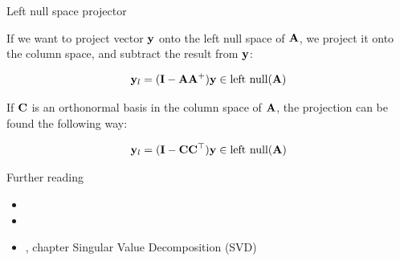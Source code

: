\documentclass{beamer}
\begin{document}
\begin{frame}{Left null space projector}
	\begin{flushleft}
		
		If we want to project vector $\mathbf{y}$ onto the left null space of $\mathbf{A}$, we project it onto the column space, and subtract the result from $\mathbf{y}$:
		
		\begin{equation}
			\mathbf{y}_l = (\mathbf{I} - \mathbf{A}\mathbf{A}^+) \mathbf{y} \in \text{left null}(\mathbf{A})
		\end{equation}
		
		If $\mathbf{C}$ is an orthonormal basis in the column space of $\mathbf{A}$, the projection can be found the following way:
		
		\begin{equation}
			\mathbf{y}_l = (\mathbf{I} - \mathbf{C}\mathbf{C}^\top) \mathbf{y} \in \text{left null}(\mathbf{A})
		\end{equation}
		
		
	\end{flushleft}
\end{frame}





\begin{frame}{Further reading}
	\begin{flushleft}
		
		\begin{itemize}
			\item {}
			
			\item {}
			
			\item {}, chapter Singular Value Decomposition (SVD)
			
		\end{itemize}
		
		
	\end{flushleft}
\end{frame}
\end{document}
